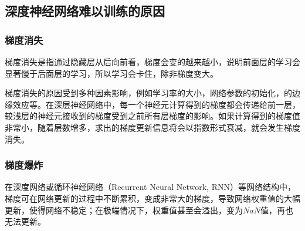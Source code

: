 \documentclass[UTF8]{ctexart}
\begin{document}
\subsection{深度神经网络难以训练的原因}
\subsubsection{梯度消失}
梯度消失是指通过隐藏层从后向前看，梯度会变的越来越小，说明前面层的学习会显著慢于后面层的学习，所以学习会卡住，除非梯度变大。
\par 梯度消失的原因受到多种因素影响，例如学习率的大小，网络参数的初始化，的边缘效应等。在深层神经网络中，每一个神经元计算得到的梯度都会传递给前一层，较浅层的神经元接收到的梯度受到之前所有层梯度的影响。如果计算得到的梯度值非常小，随着层数增多，求出的梯度更新信息将会以指数形式衰减，就会发生梯度消失。
\subsubsection{梯度爆炸}
在深度网络或循环神经网络（Recurrent Neural Network, RNN）等网络结构中，梯度可在网络更新的过程中不断累积，变成非常大的梯度，导致网络权重值的大幅更新，使得网络不稳定；在极端情况下，权重值甚至会溢出，变为$NaN$值，再也无法更新。
\end{document}
